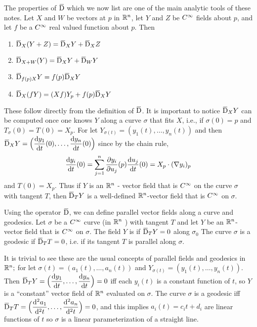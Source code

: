 \documentclass[../main]{subfiles}
\begin{document}
The properties of $\covariant$ which we now list are one of the main analytic tools of these notes. Let $X$ and $W$ be vectors at $p$ in $\mathbb{R}^{n}$, let $Y$ and $Z$ be $C^\infty$ fields about $p$, and let $f$ be a $C^\infty$ real valued function about $p$. Then
\begin{enumerate}[label=(\arabic*)]
    \item\label{enu:ch02.1.1} $\covariant_{X}(Y+Z)=\covariant_{X} Y+\covariant_{X} Z$
    \item\label{enu:ch02.1.2} $\covariant_{X+W}(Y)=\covariant_{X} Y+\covariant_{W} Y$
    \item\label{enu:ch02.1.3} $\covariant_{f(p) X} Y=f(p) \covariant_{X} Y$
    \item\label{enu:ch02.1.4} $\covariant_{X}(f Y)=(X f) Y_{p}+f(p) \covariant_{X} Y$
\end{enumerate}


These follow directly from the definition of $\covariant$. It is important to notice $\covariant_{X} Y$ can be computed once one knows $Y$ along a curve $\sigma$ that fits $X$, i.e., if $\sigma(0)=p$ and $T_{\sigma}(0)=T(0)=X_{p}$. For let $Y_{\sigma(t)}=(y_{1}(t),\ldots, y_{n}(t))$ and then $\covariant_{X} Y=\Big(\dv{y_1}{t}(0), \ldots, \dv{y_n}{t}(0)\Big)$ since by the chain rule, \[\dfrac{\mathrm{d}y_i}{\mathrm{d}t}(0)=\sum_{j=1}^{n} \dfrac{\partial y_i}{\partial u_j}(p)\dfrac{\mathrm{d}u_j}{\mathrm{d}t}(0)=X_{p} \cdot (\nabla y_{i})_{p}\] and $T(0)=X_{p}$. Thus if $Y$ is an $\mathbb{R}^{n}$ - vector field that is $C^\infty$ on the curve $\sigma$ with tangent $T$, then $\covariant_{T} Y$ is a well-defined $\mathbb{R}^{n}$-vector field that is $C^\infty$ on $\sigma$.

Using the operator $\covariant$, we can define parallel vector fields along a curve and geodesics. Let $\sigma$ be a $C^\infty$ curve (in $\mathbb{R}^{n}$ ) with tangent $T$ and let $Y$ be an $\mathbb{R}^{n}$-vector field that is $C^\infty$ on $\sigma$. The field $Y$ is  if $\covariant_{T} Y = 0$ along $\sigma_{0}$ The curve $\sigma$ is a geodesic  if $\covariant_{T} T = 0$, i.e. if its tangent $T$ is parallel along $\sigma$.

It is trivial to see these are the usual concepts of parallel fields and geodesics in $\mathbb{R}^{n} ;$ for let $\sigma(t)=(a_{1}(t), \ldots, a_{n}(t))$ and $Y_{\sigma(t)}=(y_{1}(t), \ldots, y_{n}(t))$. Then $\covariant_{T} Y=\Big(\dv{y_1}{t}, \ldots, \dv{y_n}{t}\Big)=0$ iff each $y_{i}(t)$ is a constant function of $t$, so $Y$ is a ``constant'' vector field of $\mathbb{R}^{n}$ evaluated on $\sigma$. The curve $\sigma$ is a geodesic iff $\covariant_{T} T=\Big(\dvn{a_1}{t}{2}, \ldots, \dvn{a_n}{t}{2} \Big)=0$, and this implies $a_{i}(t)=c_{i} t+d_{i}$ are linear functions of $t$ so $\sigma$ is a linear parameterization of a straight line.
\end{document}
